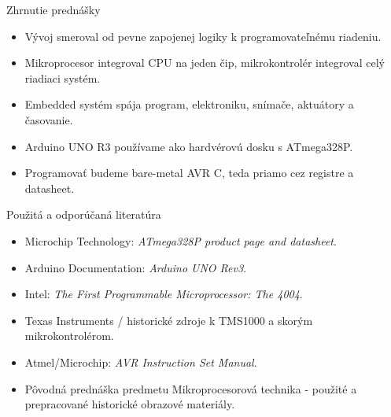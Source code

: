\begin{frame}{Zhrnutie prednášky}
\begin{itemize}
  \item Vývoj smeroval od pevne zapojenej logiky k programovateľnému riadeniu.
  \item Mikroprocesor integroval CPU na jeden čip, mikrokontrolér integroval celý riadiaci systém.
  \item Embedded systém spája program, elektroniku, snímače, aktuátory a časovanie.
  \item Arduino UNO R3 používame ako hardvérovú dosku s ATmega328P.
  \item Programovať budeme bare-metal AVR C, teda priamo cez registre a datasheet.
\end{itemize}
\end{frame}

\begin{frame}{Použitá a odporúčaná literatúra}
\footnotesize
\begin{itemize}
  \item Microchip Technology: \textit{ATmega328P product page and datasheet}.
  \item Arduino Documentation: \textit{Arduino UNO Rev3}.
  \item Intel: \textit{The First Programmable Microprocessor: The 4004}.
  \item Texas Instruments / historické zdroje k TMS1000 a skorým mikrokontrolérom.
  \item Atmel/Microchip: \textit{AVR Instruction Set Manual}.
  \item Pôvodná prednáška predmetu Mikroprocesorová technika - použité a prepracované historické obrazové materiály.
\end{itemize}
\end{frame}
